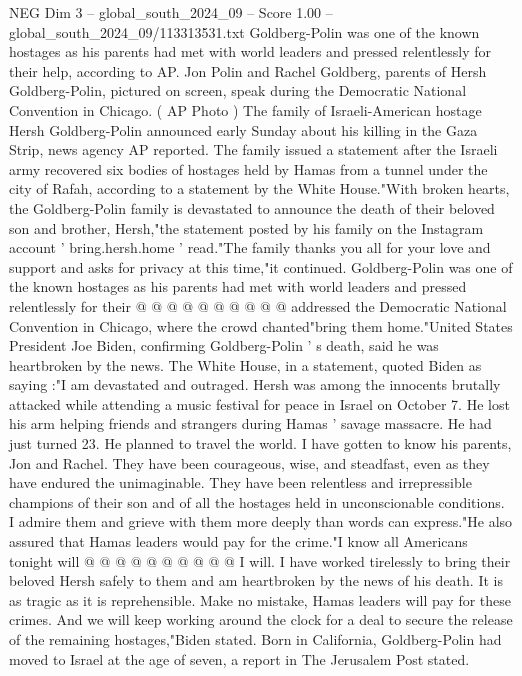 \begin{textsample}{NEG Dim 3 – global\_south\_2024\_09 – Score 1.00 – global\_south\_2024\_09/113313531.txt}  \label{ex:f3_neg_135}
Goldberg-Polin was one of the known hostages as his parents had met with world leaders and pressed relentlessly for their help, according to AP.
Jon Polin and Rachel Goldberg, parents of Hersh Goldberg-Polin, pictured on screen, speak during the Democratic National Convention in Chicago. ( AP Photo ) The family of Israeli-American hostage Hersh Goldberg-Polin announced early Sunday about his killing in the Gaza Strip, news agency AP reported.
The family issued a statement after the Israeli army recovered six bodies of hostages held by Hamas from a tunnel under the city of Rafah, according to a statement by the White House."With broken hearts, the Goldberg-Polin family is devastated to announce the death of their beloved son and brother, Hersh,"the statement posted by his family on the Instagram account ' bring.hersh.home ' read."The family thanks you all for your love and support and asks for privacy at this time,"it continued.
Goldberg-Polin was one of the known hostages as his parents had met with world leaders and pressed relentlessly for their @ @ @ @ @ @ @ @ @ @ addressed the Democratic National Convention in Chicago, where the crowd chanted"bring them home."United States President Joe Biden, confirming Goldberg-Polin ' s death, said he was heartbroken by the news.
The White House, in a statement, quoted Biden as saying :"I am devastated and outraged.
Hersh was among the innocents brutally attacked while attending a music festival for peace in Israel on October 7.
He lost his arm helping friends and strangers during Hamas ' savage massacre.
He had just turned 23.
He planned to travel the world.
I have gotten to know his parents, Jon and Rachel.
They have been courageous, wise, and steadfast, even as they have endured the unimaginable.
They have been relentless and irrepressible champions of their son and of all the hostages held in unconscionable conditions.
I admire them and grieve with them more deeply than words can express."He also assured that Hamas leaders would pay for the crime."I know all Americans tonight will @ @ @ @ @ @ @ @ @ @ I will.
I have worked tirelessly to bring their beloved Hersh safely to them and am heartbroken by the news of his death.
It is as tragic as it is reprehensible.
Make no mistake, Hamas leaders will pay for these crimes.
And we will keep working around the clock for a deal to secure the release of the remaining hostages,"Biden stated.
Born in California, Goldberg-Polin had moved to Israel at the age of seven, a report in The Jerusalem Post stated.

\end{textsample}
